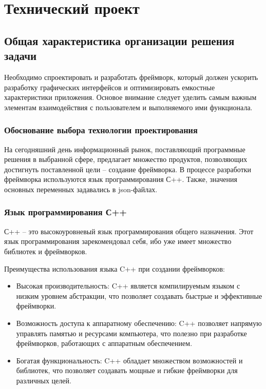 \section{Технический проект}
\subsection{Общая характеристика организации решения задачи}

Необходимо спроектировать и разработать фреймворк, который должен ускорить разработку графических интерфейсов и оптимизировать емкостные характеристики приложения.
Основое внимание следует уделить самым важным элементам взаимодействия с пользователем и выполняемого ими функционала.

\subsubsection{Обоснование выбора технологии проектирования}

На сегодняшний день информационный рынок, поставляющий программные решения в выбранной сфере, предлагает множество продуктов, позволяющих достигнуть поставленной цели – создание фреймворка.
В процессе разработки фреймворка используются язык программирования С++. Также, значения основных переменных задавались в json-файлах.

\subsubsection{Язык программирования С++}

С++ – это высокоуровневый язык программирования общего назначения. Этот язык программирования зарекомендовал себя, ибо уже имеет множество библиотек и фреймворков.

Преимущества использования языка C++ при создании фреймворков:
\begin{itemize}
\item Высокая производительность: C++ является компилируемым языком с низким уровнем абстракции, что позволяет создавать быстрые и эффективные фреймворки.
\item Возможность доступа к аппаратному обеспечению: C++ позволяет напрямую управлять памятью и ресурсами компьютера, что полезно при разработке фреймворков, работающих с аппаратным обеспечением.
\item Богатая функциональность: C++ обладает множеством возможностей и библиотек, что позволяет создавать мощные и гибкие фреймворки для различных целей.
\end{itemize}


